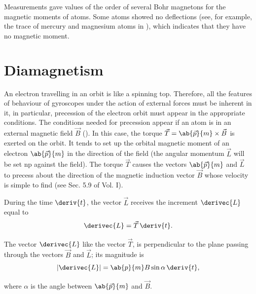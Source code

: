 Measurements gave values of the order of several Bohr magnetons for the magnetic moments of atoms.
Some atoms showed no deflections (see, for example, the trace of mercury and magnesium atoms in ), which indicates that they have no magnetic moment.

\section{Diamagnetism}\label{sec:7_7}

An electron travelling in an orbit is like a spinning top.
Therefore, all the features of behaviour of gyroscopes under the action of external forces must be inherent in it, in particular, precession of the electron orbit must appear in the appropriate conditions.
The conditions needed for precession appear if an atom is in an external magnetic field $\vec{B}$ ().
In this case, the torque $\vec{T} = \ab{\vec{p}}{m}\times\vec{B}$ is exerted on the orbit.
It tends to set up the orbital magnetic moment of an electron $\ab{\vec{p}}{m}$ in the direction of the field (the angular momentum $\vec{L}$ will be set np against the field).
The torque $\vec{T}$ causes the vectors $\ab{\vec{p}}{m}$ and $\vec{L}$ to precess about the direction of the magnetic induction vector $\vec{B}$ whose velocity is simple to find (see Sec. 5.9 of Vol. I).

During the time $\deriv{t}$, the vector $\vec{L}$ receives the increment $\derivec{L}$ equal to
\begin{equation*}
    \derivec{L} = \vec{T}\, \deriv{t}.
\end{equation*}

\noindent
The vector $\derivec{L}$ like the vector $\vec{T}$, is perpendicular to the plane passing through the vectors $\vec{B}$ and $\vec{L}$; its magnitude is
\begin{equation*}
    |\derivec{L}| = \ab{p}{m} B \sin\alpha\, \deriv{t},
\end{equation*}

\noindent
where $\alpha$ is the angle between $\ab{\vec{p}}{m}$ and $\vec{B}$.

